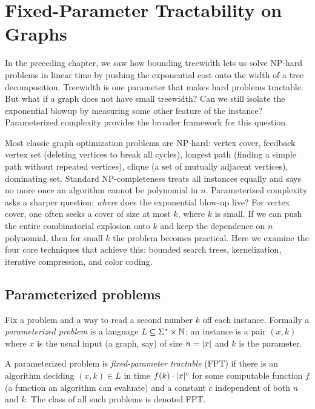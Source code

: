 \chapter{Fixed-Parameter Tractability on Graphs}

In the preceding chapter, we saw how bounding treewidth lets us solve NP-hard problems
in linear time by pushing the exponential cost onto the width of a tree decomposition.
Treewidth is one parameter that makes hard problems tractable. But what if a graph does not have small
treewidth? Can we still isolate the exponential blowup by measuring some other feature of
the instance? Parameterized complexity provides the broader framework for this question.

Most classic graph optimization problems are NP-hard: vertex cover, feedback vertex set (deleting vertices to break all cycles),
longest path (finding a simple path without repeated vertices), clique (a set of mutually adjacent vertices), dominating set. Standard NP-completeness treats all instances equally
and says no more once an algorithm cannot be polynomial in $n$. Parameterized
complexity asks a sharper question: \emph{where} does the exponential blow-up live?
For vertex cover, one often seeks a cover of size at most $k$, where $k$ is small. If we
can push the entire combinatorial explosion onto $k$ and keep the dependence on $n$
polynomial, then for small $k$ the problem becomes practical. Here we examine the four
core techniques that achieve this: bounded search trees, kernelization, iterative compression,
and color coding.

\chapterline

\section{Parameterized problems}

Fix a problem and a way to read a second number $k$ off each instance. Formally a \emph{parameterized problem} is a language $L \subseteq \Sigma^* \times \mathbb{N}$; an instance is a pair $(x,k)$ where $x$ is the usual input (a graph, say) of size $n=\lvert x\rvert$ and $k$ is the parameter.

\begin{definition}\label{ch25:def-fpt}
A parameterized problem is \emph{fixed-parameter tractable} (FPT) if there is an algorithm deciding $(x,k)\in L$ in time $f(k)\cdot \lvert x\rvert^{c}$ for some computable function $f$ (a function an algorithm can evaluate) and a constant $c$ independent of both $n$ and $k$. The class of all such problems is denoted FPT.
\end{definition}

